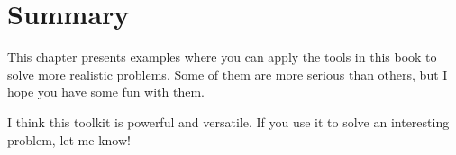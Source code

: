 \section{Summary}

This chapter presents examples where you can apply the tools in this book to solve more realistic problems.  Some of them are more serious than others, but I hope you have some fun with them.

I think this toolkit is powerful and versatile.  If you use it to solve an interesting problem, let me know!



